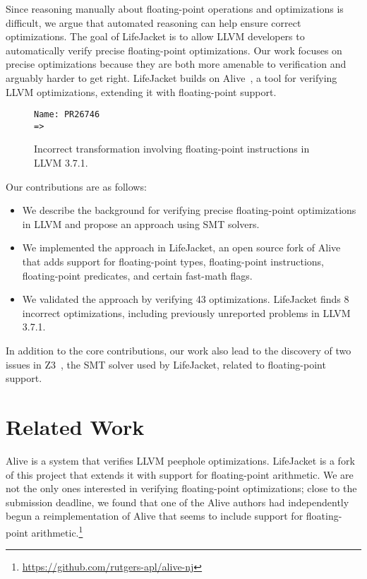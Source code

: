 \documentclass[preprint, numbers]{sigplanconf}
\newcommand{\xxx}{LifeJacket}
\newcommand{\numverified}{43}
\newcommand{\numbugs}{8}
\newcommand{\numnewbugs}{3}
\begin{document}
Since reasoning manually about floating-point operations and optimizations is
difficult, we argue that automated reasoning can help ensure correct
optimizations. The goal of \xxx{} is to allow LLVM developers to automatically
verify precise floating-point optimizations. Our work focuses on precise
optimizations because they are both more amenable to verification and arguably
harder to get right. \xxx{} builds on Alive~\cite{lopes2015provably}, a tool
for verifying LLVM optimizations, extending it with floating-point support.

\begin{figure}
\small
\begin{Verbatim}
Name: PR26746
=>
\end{Verbatim}

\caption{Incorrect transformation involving floating-point instructions in LLVM
3.7.1.}
\label{fig:bug}

\end{figure}

Our contributions are as follows:

\begin{itemize}

\item We describe the background for verifying precise floating-point
optimizations in LLVM and propose an approach using SMT solvers.

\item We implemented the approach in \xxx{}, an open source fork of Alive that
adds support for floating-point types, floating-point instructions,
floating-point predicates, and certain fast-math flags.

\item We validated the approach by verifying \numverified{} optimizations.
\xxx{} finds \numbugs{} incorrect optimizations, including
\numberstringnum{\numnewbugs} previously unreported problems in LLVM 3.7.1.

\end{itemize}

In addition to the core contributions, our work also lead to the discovery of
two issues in Z3~\cite{de2008z3}, the SMT solver used by \xxx{}, related to
floating-point support.

\section{Related Work} \label{sec:related}

Alive is a system that verifies LLVM peephole optimizations. \xxx{} is a fork
of this project that extends it with support for floating-point arithmetic.  We
are not the only ones interested in verifying floating-point optimizations;
close to the submission deadline, we found that one of the Alive authors had
independently begun a reimplementation of Alive that seems to include support
for floating-point
arithmetic.\footnote{\url{https://github.com/rutgers-apl/alive-nj}}
\end{document}
